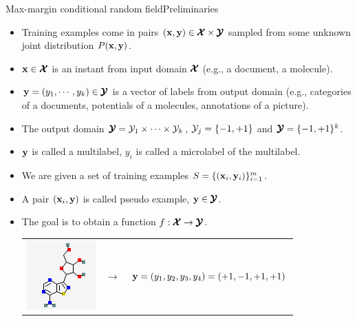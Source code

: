 \documentclass[first=dgreen,second=purple,logo=yellowexc]{aaltoslides}
\begin{document}
{\begin{frame}{Max-margin conditional random field}{Preliminaries}
	\begin{itemize}
		\item Training examples come in pairs $(\mathbf {x},\mathbf {y})\in\pmb {\mathcal{X}}\times\pmb {\mathcal{Y}}$ sampled from some unknown joint distribution $P(\mathbf {x},\mathbf {y})$.
		\item $\mathbf {x}\in\pmb {\mathcal{X}}$ is an instant from input domain $\pmb {\mathcal{X}}$ (e.g., a document, a molecule).
		\item $\mathbf {y}=(y_1,\cdots,y_k)\in\pmb {\mathcal{Y}}$ is a vector of labels from output domain (e.g., categories of a documents, potentials of a molecules, annotations of a picture).
		\item The output domain $\pmb {\mathcal{Y}}=\mathcal{Y}_1\times\cdots\times\mathcal{Y}_k$, $\mathcal{Y}_j=\{-1,+1\}$ and $\pmb {\mathcal{Y}}=\{-1,+1\}^k$.
		\item $\mathbf {y}$ is called a multilabel, $y_i$ is called a microlabel of the multilabel.
		\item We are given a set of training examples $S=\{(\mathbf {x}_i,\mathbf {y}_i)\}_{i=1}^m$.
		\item A pair $(\mathbf {x}_i,\mathbf {y})$ is called pseudo example, $\mathbf {y}\in\pmb {\mathcal{Y}}$.
		\item The goal is to obtain a function $f:\pmb {\mathcal{X}}\rightarrow\pmb {\mathcal{Y}}$.
		\begin{table}
		\footnotesize
		\begin{tabular}{p{1cm}p{1cm}p{10cm}}
        \multirow{3}{*}{\includegraphics[scale = 0.3]{./figures/mol1.png}} & 
			& \\ 
		& $\rightarrow$	& $\mathbf {y}=(y_1,y_2,y_3,y_4)=(+1,-1,+1,+1)$ \\
		&	& \\ 
        \end{tabular}
        \end{table}
	\end{itemize}
\end{frame}



}
\end{document}
